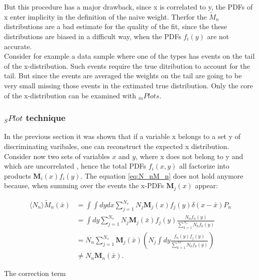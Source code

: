 \documentclass[english]{uzhpub}
\begin{document}
 But this procedure has a major drawback, since x is correlated to y, the PDFs of x enter implicity in the definition of the naive weight. Therfor the $\tilde{M}_n$ distributions are a bad estimate for the quality of the fit, since the these distributions are biased in a difficult way, when the PDFs $f_i(y)$ are not accurate. \\
 Consider for example a data sample where one of the types has events on the tail of the x-distribution. Such events require the true ditribution to account for the tail. But since the events are averaged the weights on the tail are going to be very small missing those events in the extimated true distribution. Only the core of the x-distribution can be examined with $_{in} Plots$.


 \subsubsection{$_{S} Plot$ technique}
 In the previous section it was shown that if a variable x belongs to a set y of discriminating varibales, one can reconstruct the expected x distribution.
 Consider now two sets of variables $x$ and $y$, where x does not belong to y and which are uncorrelated , hence the total PDFs $f_i (x,y)$ all factorize into products $\textbf{M}_i (x) f_i(y)$.
 The equation \ref{eq:N_nM_n} does not hold anymore because, when summing over the events the x-PDFs $\textbf{M}_j(x)$ appear:

 \begin{align}
  \langle N_n \rangle \tilde{M}_n (\bar{x}) & = \int \int dy dx \sum_{j=1}^{N_s} N_j \textbf{M}_j (x) f_j (y) \delta (x- \bar{x}) P_n \label{eq:M_nX}                    \\
                                            & = \int dy \sum_{j=1}^{N_s} N_j \textbf{M}_j (\bar{x}) f_j(y) \frac{N_n f_n(y)}{\sum_{k=1}^{N_s} N_k f_k(y)}                \\
                                            & = N_n \sum_{j=1}^{N_s} \textbf{M}_j (\bar{x}) \left( N_j \int dy \frac{f_n(y) f_j(y)}{\sum_{k=1}^{Ns} N_k f_k (y)} \right) \\
                                            & \neq N_n \textbf{M}_n (\bar{x}).
 \end{align}

 The correction term
\end{document}
